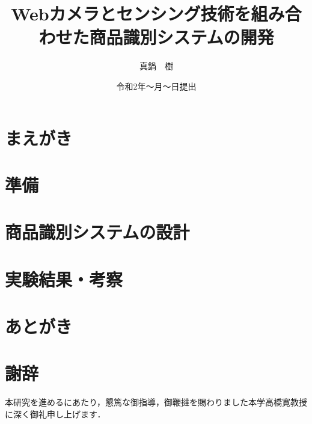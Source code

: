 
\newenvironment{indention}[1]{\par
\addtolength{\leftskip}{#1}
\begingroup}{\endgroup\par}

\title{Webカメラとセンシング技術を組み合わせた商品識別システムの開発}
\author{真鍋　樹}
\date{令和2年～月～日提出}


\maketitle
\tableofcontents
\cleardoublepage
{}

\chapter{まえがき}


\chapter{準備}


\chapter{商品識別システムの設計}





\chapter{実験結果・考察}




\chapter{あとがき}



\newpage
{}
\chapter*{謝辞}
本研究を進めるにあたり，懇篤な御指導，御鞭撻を賜わりました本学高橋寛教授に深く御礼申し上げます．

